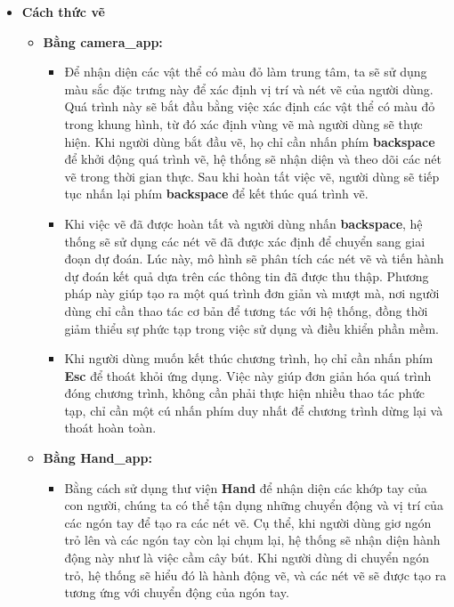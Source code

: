 \begin{itemize}
    \item \textbf{Cách thức vẽ}

\begin{itemize}
    \item \textbf{Bằng camera\_app:}

    \begin{itemize}
        \item Để nhận diện các vật thể có màu đỏ làm trung tâm, ta sẽ sử dụng màu sắc đặc trưng này để xác định vị trí và nét vẽ của người dùng. Quá trình này sẽ bắt đầu bằng việc xác định các vật thể có màu đỏ trong khung hình, từ đó xác định vùng vẽ mà người dùng sẽ thực hiện. Khi người dùng bắt đầu vẽ, họ chỉ cần nhấn phím \textbf{backspace} để khởi động quá trình vẽ, hệ thống sẽ nhận diện và theo dõi các nét vẽ trong thời gian thực. Sau khi hoàn tất việc vẽ, người dùng sẽ tiếp tục nhấn lại phím \textbf{backspace} để kết thúc quá trình vẽ.

        \item Khi việc vẽ đã được hoàn tất và người dùng nhấn \textbf{backspace}, hệ thống sẽ sử dụng các nét vẽ đã được xác định để chuyển sang giai đoạn dự đoán. Lúc này, mô hình sẽ phân tích các nét vẽ và tiến hành dự đoán kết quả dựa trên các thông tin đã được thu thập. Phương pháp này giúp tạo ra một quá trình đơn giản và mượt mà, nơi người dùng chỉ cần thao tác cơ bản để tương tác với hệ thống, đồng thời giảm thiểu sự phức tạp trong việc sử dụng và điều khiển phần mềm.

        \item Khi người dùng muốn kết thúc chương trình, họ chỉ cần nhấn phím \textbf{Esc} để thoát khỏi ứng dụng. Việc này giúp đơn giản hóa quá trình đóng chương trình, không cần phải thực hiện nhiều thao tác phức tạp, chỉ cần một cú nhấn phím duy nhất để chương trình dừng lại và thoát hoàn toàn.
    \end{itemize}
    \item \textbf{Bằng Hand\_app:}

    \begin{itemize}
        \item Bằng cách sử dụng thư viện \textbf{Hand} để nhận diện các khớp tay của con người, chúng ta có thể tận dụng những chuyển động và vị trí của các ngón tay để tạo ra các nét vẽ. Cụ thể, khi người dùng giơ ngón trỏ lên và các ngón tay còn lại chụm lại, hệ thống sẽ nhận diện hành động này như là việc cầm cây bút. Khi người dùng di chuyển ngón trỏ, hệ thống sẽ hiểu đó là hành động vẽ, và các nét vẽ sẽ được tạo ra tương ứng với chuyển động của ngón tay.


\end{itemize}
\end{itemize}
\end{itemize}
